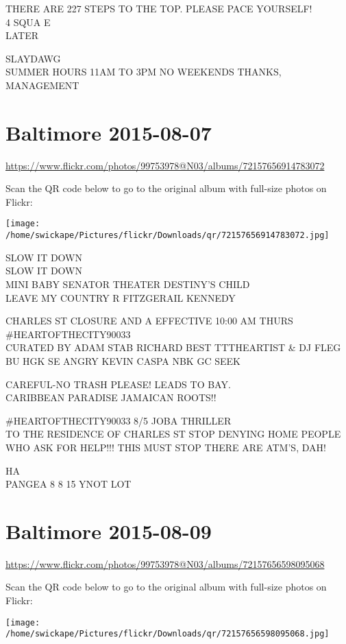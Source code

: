 \documentclass[10pt,letterpaper]{article}
\begin{document}
THERE ARE 227 STEPS TO THE TOP.  PLEASE PACE YOURSELF!\\
4 SQUA E\\
LATER

SLAYDAWG\\
SUMMER HOURS 11AM TO 3PM NO WEEKENDS THANKS, MANAGEMENT
\pagebreak

\section*{Baltimore 2015-08-07}

\url{https://www.flickr.com/photos/99753978@N03/albums/72157656914783072}

Scan the QR code below to go to the original album with full-size photos on Flickr:

\texttt{[image: /home/swickape/Pictures/flickr/Downloads/qr/72157656914783072.jpg]}
\pagebreak

SLOW IT DOWN\\
SLOW IT DOWN\\
MINI BABY SENATOR THEATER DESTINY'S CHILD\\
LEAVE MY COUNTRY R FITZGERAIL KENNEDY

CHARLES ST CLOSURE AND A EFFECTIVE 10:00 AM THURS\\
\#HEARTOFTHECITY90033\\
CURATED BY ADAM STAB RICHARD BEST TTTHEARTIST \& DJ FLEG\\
BU HGK SE ANGRY KEVIN CASPA NBK GC SEEK

CAREFUL{-}NO TRASH PLEASE! LEADS TO BAY.\\
CARIBBEAN PARADISE JAMAICAN ROOTS!!

\#HEARTOFTHECITY90033 8/5 JOBA THRILLER\\
TO THE RESIDENCE OF CHARLES ST STOP DENYING HOME PEOPLE WHO ASK FOR HELP!!!  THIS MUST STOP THERE ARE ATM'S, DAH!

HA\\
PANGEA 8 8 15 YNOT LOT
\pagebreak

\section*{Baltimore 2015-08-09}

\url{https://www.flickr.com/photos/99753978@N03/albums/72157656598095068}

Scan the QR code below to go to the original album with full-size photos on Flickr:

\texttt{[image: /home/swickape/Pictures/flickr/Downloads/qr/72157656598095068.jpg]}
\pagebreak
\end{document}
